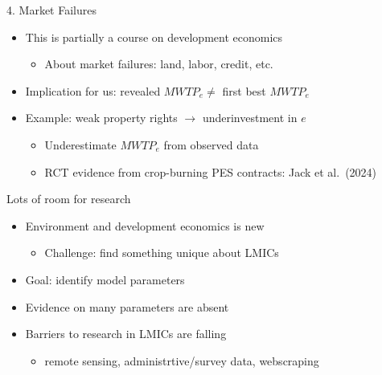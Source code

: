 \documentclass[
  ignorenonframetext,
  aspectratio=169]{beamer}
\providecommand{\tightlist}{%
  \setlength{\itemsep}{0pt}\setlength{\parskip}{0pt}}
\begin{document}
\begin{frame}{4. Market Failures}
\protect\hypertarget{market-failures}{}
\begin{itemize}
\tightlist
\item
  This is partially a course on development economics

  \begin{itemize}
  \tightlist
  \item
    About market failures: land, labor, credit, etc. \vfill
  \end{itemize}
\item
  Implication for us: revealed \(MWTP_{e} \neq\) first best \(MWTP_{e}\)
  \vfill
\item
  Example: weak property rights \(\rightarrow\) underinvestment in \(e\)

  \begin{itemize}
  \tightlist
  \item
    Underestimate \(MWTP_{e}\) from observed data
  \item
    RCT evidence from crop-burning PES contracts: Jack et al.~(2024)
    \vfill
  \end{itemize}
\end{itemize}
\end{frame}

\begin{frame}{Lots of room for research}
\protect\hypertarget{lots-of-room-for-research}{}
\begin{itemize}
\tightlist
\item
  Environment and development economics is new

  \begin{itemize}
  \tightlist
  \item
    Challenge: find something unique about LMICs \vfill
  \end{itemize}
\item
  Goal: identify model parameters \vfill
\item
  Evidence on many parameters are absent \vfill
\item
  Barriers to research in LMICs are falling

  \begin{itemize}
  \tightlist
  \item
    remote sensing, administrtive/survey data, webscraping \vfill
  \end{itemize}
\end{itemize}
\end{frame}
\end{document}
